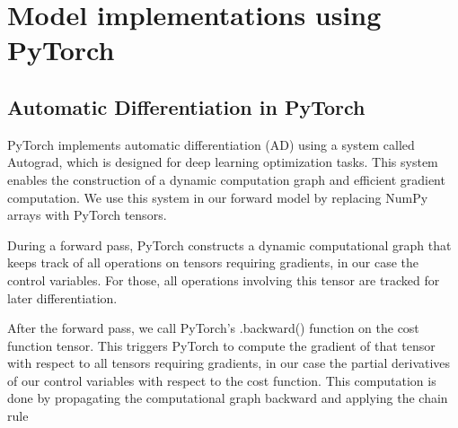 \documentclass[journal abbreviation, manuscript]{copernicus}
\begin{document}










\appendix
\section{Model implementations using PyTorch}    %

\subsection{Automatic Differentiation in PyTorch}
\label{appendix:AD_in_Pytorch}

PyTorch implements automatic differentiation (AD) using a system called Autograd, which is designed for deep learning optimization tasks. This system enables the construction of a dynamic computation graph and efficient gradient computation. We use this system in our forward model by replacing NumPy arrays with PyTorch tensors.

During a forward pass, PyTorch constructs a dynamic computational graph that keeps track of all operations on tensors requiring gradients, in our case the control variables. For those, all operations involving this tensor are tracked for later differentiation.

After the forward pass, we call PyTorch's .backward() function on the cost function tensor. This triggers PyTorch to compute the gradient of that tensor with respect to all tensors requiring gradients, in our case the partial derivatives of our control variables with respect to the cost function. This computation is done by propagating the computational graph backward and applying the chain rule
\end{document}
